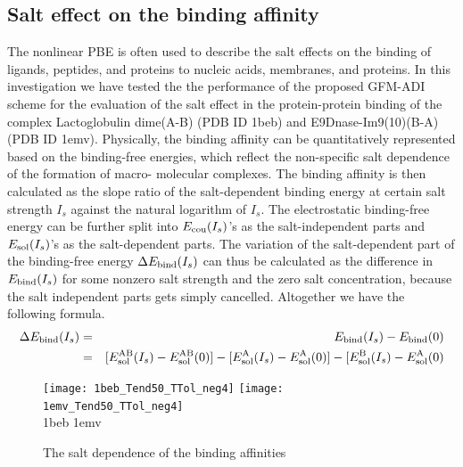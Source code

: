 \subsection{Salt effect on the binding affinity}
The nonlinear PBE is often used to describe the salt effects on the binding of ligands, peptides, and proteins to nucleic acids, membranes, and proteins. In this investigation we have tested the the performance of the proposed GFM-ADI scheme for the evaluation of the salt effect in the protein-protein binding of the complex Lactoglobulin dime(A-B) (PDB ID 1beb) and E9Dnase-Im9(10)(B-A)(PDB ID 1emv). Physically, the binding affinity can be quantitatively represented based on the binding-free energies, which reflect the non-specific salt dependence of the formation of macro- molecular complexes. The binding affinity is then calculated as the slope ratio of the salt-dependent binding energy at certain salt strength $I_s$ against the natural logarithm of $I_s$.
The electrostatic binding-free energy can be further split into $E_{\rm cou}(I_s)$'s as the salt-independent parts and $E_{\rm sol}(I_s)$'s as the salt-dependent parts. The variation of the salt-dependent part of the binding-free energy $\Delta E_{\rm bind}(I_s)$ can thus be calculated as the difference in $E_{\rm bind}(I_s)$ for some nonzero salt strength and the zero salt concentration, because the salt independent parts gets simply cancelled. Altogether we have the following formula.\\
\begin{eqnarray}
	\Delta E_{\rm bind}(I_s) &=& E_{\rm bind}(I_s)- E_{\rm bind}(0)\label{eq_del_e_bind} \nonumber\\
						 &=& [E_{\rm sol}^{\rm AB}(I_s)-E_{\rm sol}^{\rm AB}(0)]-[E_{\rm sol}^{\rm A}(I_s)-E_{\rm sol}^{\rm A}(0)]- [E_{\rm sol}^{\rm B}(I_s)-E_{\rm sol}^{\rm A}(0)
\end{eqnarray}
						 
\begin{figure}[!ht]
\begin{center}
\texttt{[image: 1beb\_Tend50\_TTol\_neg4]}
\texttt{[image: 1emv\_Tend50\_TTol\_neg4]}
\\
1beb \hskip 2.7in 1emv
\end{center}
\caption{The salt dependence of the binding affinities}
\label{fig_salt_effect}
\end{figure}

